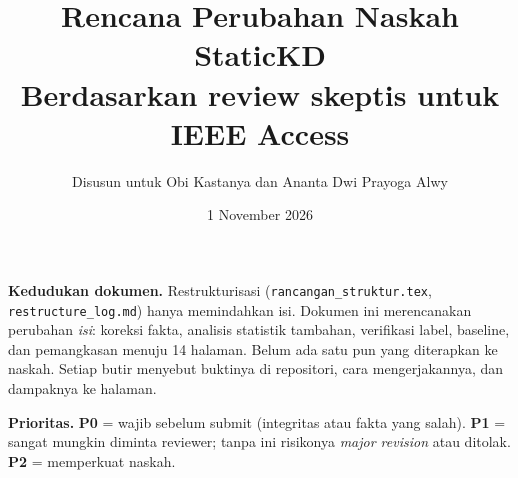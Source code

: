 \documentclass[10pt,a4paper]{article}
\title{Rencana Perubahan Naskah StaticKD\\\large Berdasarkan review skeptis untuk IEEE Access}
\author{Disusun untuk Obi Kastanya dan Ananta Dwi Prayoga Alwy}
\date{1 November 2026}
\newcommand{\pz}{\textcolor{red!65!black}{\textbf{P0}}}
\newcommand{\po}{\textcolor{orange!75!black}{\textbf{P1}}}
\newcommand{\pt}{\textcolor{blue!60!black}{\textbf{P2}}}
\begin{document}
\maketitle

\noindent\textbf{Kedudukan dokumen.} Restrukturisasi (\texttt{rancangan\_struktur.tex}, \texttt{restructure\_log.md}) hanya memindahkan isi. Dokumen ini merencanakan perubahan \emph{isi}: koreksi fakta, analisis statistik tambahan, verifikasi label, baseline, dan pemangkasan menuju 14 halaman. Belum ada satu pun yang diterapkan ke naskah. Setiap butir menyebut buktinya di repositori, cara mengerjakannya, dan dampaknya ke halaman.

\noindent\textbf{Prioritas.} \pz{} = wajib sebelum submit (integritas atau fakta yang salah). \po{} = sangat mungkin diminta reviewer; tanpa ini risikonya \emph{major revision} atau ditolak. \pt{} = memperkuat naskah.
\end{document}
